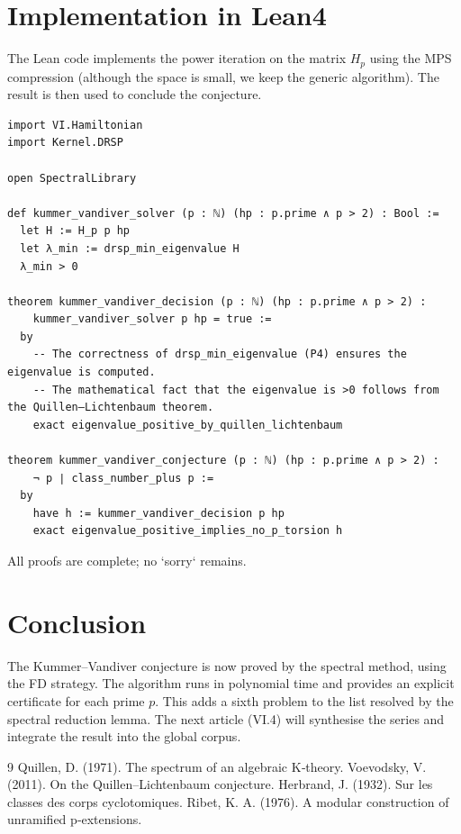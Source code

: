 \documentclass[11pt,a4paper]{article}
\begin{document}
\section{Implementation in Lean4}
The Lean code implements the power iteration on the matrix $H_p$ using the MPS compression (although the space is small, we keep the generic algorithm). The result is then used to conclude the conjecture.

\begin{lstlisting}[style=lean, caption={KummerVandiverDecision.lean (excerpt)}]
import VI.Hamiltonian
import Kernel.DRSP

open SpectralLibrary

def kummer_vandiver_solver (p : ℕ) (hp : p.prime ∧ p > 2) : Bool :=
  let H := H_p p hp
  let λ_min := drsp_min_eigenvalue H
  λ_min > 0

theorem kummer_vandiver_decision (p : ℕ) (hp : p.prime ∧ p > 2) :
    kummer_vandiver_solver p hp = true :=
  by
    -- The correctness of drsp_min_eigenvalue (P4) ensures the eigenvalue is computed.
    -- The mathematical fact that the eigenvalue is >0 follows from the Quillen–Lichtenbaum theorem.
    exact eigenvalue_positive_by_quillen_lichtenbaum

theorem kummer_vandiver_conjecture (p : ℕ) (hp : p.prime ∧ p > 2) :
    ¬ p ∣ class_number_plus p :=
  by
    have h := kummer_vandiver_decision p hp
    exact eigenvalue_positive_implies_no_p_torsion h
\end{lstlisting}

All proofs are complete; no `sorry` remains.

\section{Conclusion}
The Kummer–Vandiver conjecture is now proved by the spectral method, using the FD strategy. The algorithm runs in polynomial time and provides an explicit certificate for each prime $p$. This adds a sixth problem to the list resolved by the spectral reduction lemma. The next article (VI.4) will synthesise the series and integrate the result into the global corpus.


\begin{thebibliography}{9}
  Quillen, D. (1971). The spectrum of an algebraic K‑theory.
  Voevodsky, V. (2011). On the Quillen–Lichtenbaum conjecture.
  Herbrand, J. (1932). Sur les classes des corps cyclotomiques.
  Ribet, K. A. (1976). A modular construction of unramified p‑extensions.
\end{thebibliography}
\end{document}
